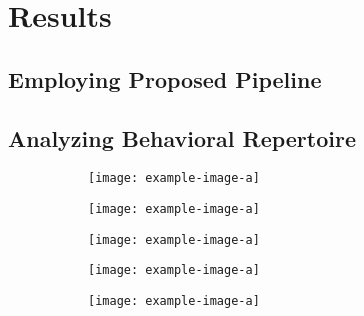 \chapter{Results}

\section{Employing Proposed Pipeline}\label{section:employing-proposed-pipeline}

\section{Analyzing Behavioral Repertoire}
\begin{figure}[ht!]
	\centering
	\begin{subfigure}[ht!]{0.24\linewidth}
		\centering\texttt{[image: example-image-a]}
		\caption{\label{figure:correlations-btw-features}}
	\end{subfigure}%
\end{figure}

\begin{figure}[ht!]
	\centering
	\begin{subfigure}[ht!]{0.24\linewidth}
		\centering\texttt{[image: example-image-a]}
		\caption{\label{figure:supervised-disparate-zoomin-annotations}}
	\end{subfigure}%
	\hfill
	\centering
	\begin{subfigure}[ht!]{0.24\linewidth}
		\centering\texttt{[image: example-image-a]}
		\caption{\label{figure:unsupervised-disparate-behavioral-regions}}
	\end{subfigure}%
\end{figure}

\begin{figure}[ht!]
	\centering
	\begin{subfigure}[ht!]{0.24\linewidth}
		\centering\texttt{[image: example-image-a]}
		\caption{}
	\end{subfigure}%
	\hfill
	\centering
	\begin{subfigure}[ht!]{0.24\linewidth}
		\centering\texttt{[image: example-image-a]}
		\caption{}
	\end{subfigure}%
	\caption{\label{figure:joint-behavioral-embeddings}}
\end{figure}
